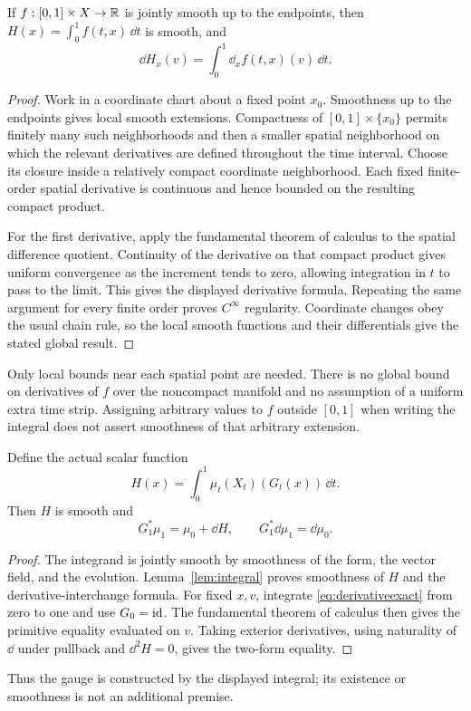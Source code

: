 \begin{lemma}\label{lem:integral}
If $f:[0,1]\times X\to\mathbb R$ is jointly smooth up to the endpoints,
then $H(x)=\int_0^1 f(t,x)\,\dd t$ is smooth, and
\[
 \dd H_x(v)=\int_0^1\dd_x f(t,x)(v)\,\dd t .
\]
\end{lemma}
\begin{proof}
Work in a coordinate chart about a fixed point $x_0$.
Smoothness up to the endpoints gives local smooth extensions.
Compactness of $[0,1]\times\{x_0\}$ permits finitely many such
neighborhoods and then a smaller spatial neighborhood on which
the relevant derivatives are defined throughout the time interval.
Choose its closure inside a relatively compact coordinate
neighborhood. Each fixed finite-order spatial derivative is
continuous and hence bounded on the resulting compact product.

For the first derivative, apply the fundamental theorem of calculus
to the spatial difference quotient. Continuity of the derivative
on that compact product gives uniform convergence as the increment
tends to zero, allowing integration in $t$ to pass to the limit.
This gives the displayed derivative formula.
Repeating the same argument for every finite order proves
$C^\infty$ regularity. Coordinate changes obey the usual chain
rule, so the local smooth functions and their differentials
give the stated global result.
\end{proof}
Only local bounds near each spatial point are needed.
There is no global bound on derivatives of $f$ over the noncompact
manifold and no assumption of a uniform extra time strip.
Assigning arbitrary values to $f$ outside $[0,1]$ when writing
the integral does not assert smoothness of that arbitrary extension.

\begin{proposition}\label{prop:exactness}
Define the actual scalar function
\[
 H(x)=\int_0^1\mu_t(X_t)(G_t(x))\,\dd t .
\]
Then $H$ is smooth and
\begin{equation}\label{eq:exactendpoint}
 G_1^*\mu_1=\mu_0+\dd H,\qquad
 G_1^*\dd\mu_1=\dd\mu_0.
\end{equation}
\end{proposition}
\begin{proof}
The integrand is jointly smooth by smoothness of the form,
the vector field, and the evolution. Lemma~\ref{lem:integral}
proves smoothness of $H$ and the derivative-interchange formula.
For fixed $x,v$, integrate \eqref{eq:derivativeexact} from zero
to one and use $G_0=\mathrm{id}$. The fundamental theorem of calculus
then gives the primitive equality evaluated on $v$.
Taking exterior derivatives, using naturality of $\dd$ under
pullback and $\dd^2H=0$, gives the two-form equality.
\end{proof}
Thus the gauge is constructed by the displayed integral; its
existence or smoothness is not an additional premise.

